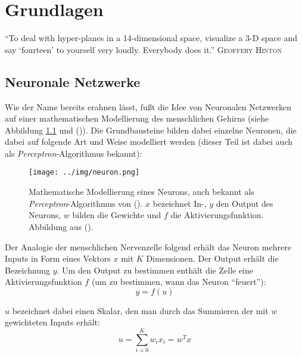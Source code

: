 
\chapter{Grundlagen} %

\label{Chapter3} %


\begin{itquote}
``To deal with hyper-planes in a 14-dimensional space, visualize a 3-D space and say `fourteen' to yourself
very loudly. Everybody does it.''
\flushright
\textsc{Geoffery Hinton}
\end{itquote}

\section{Neuronale Netzwerke}

Wie der Name bereits erahnen lässt, fußt die Idee von Neuronalen Netzwerken auf einer mathematischen Modellierung
des menschlichen Gehirns (siehe Abbildung \ref{fig:perceptron} und (\cite{rosenblatt1958perceptron})). Die Grundbausteine bilden dabei einzelne Neuronen, die dabei auf folgende Art und Weise
modelliert werden (dieser Teil ist dabei auch als \emph{Perceptron}-Algorithmus bekannt):

\begin{figure}[h]
  \centering
  \texttt{[image: ../img/neuron.png]}
  \caption[Mathematische Modellierung eines Neurons]{Mathematische Modellierung eines Neurons, auch bekannt als
  \emph{Perceptron}-Algorithmus von (\cite{rosenblatt1958perceptron}). $x$ bezeichnet In-, $y$ den Output des Neurons, $w$ bilden die Gewichte und $f$ die
  Aktivierungsfunktion. Abbildung aus (\cite{rong2014word2vec}).\label{fig:perceptron}}
\end{figure}

Der Analogie der menschlichen Nervenzelle folgend erhält das Neuron mehrere Inputs in Form eines Vektors $x$ mit $K$
Dimensionen. Der Output erhält die Bezeichnung $y$. Um den Output zu bestimmen enthält die Zelle eine Aktivierungsfunktion
$f$ (um zu bestimmen, wann das Neuron ``feuert''):
\begin{equation}
  y = f(u)
\end{equation}

$u$ bezeichnet dabei einen Skalar, den man durch das Summieren der mit $w$ gewichteten Inputs erhält:
\begin{equation}
  u = \sum_{i=0}^{K} w_i x_i = w^T x
\end{equation}

